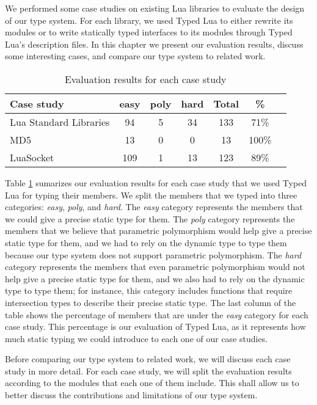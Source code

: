 
We performed some case studies on existing Lua libraries
to evaluate the design of our type system.
For each library, we used Typed Lua to either rewrite its modules
or to write statically typed interfaces to its modules through
Typed Lua's description files.
In this chapter we present our evaluation results, discuss
some interesting cases, and compare our type system to
related work.

\begin{table}[!ht]
\begin{center}
\begin{tabular}{|l|c|c|c|c|c|c|}
\hline
\textbf{Case study} & \textbf{easy} & \textbf{poly} & \textbf{hard} & \textbf{Total} & \textbf{\%} \\
\hline
Lua Standard Libraries & 94 & 5 & 34 & 133 & 71\% \\
\hline
MD5 & 13 & 0 & 0 & 13 & 100\% \\
\hline
LuaSocket & 109 & 1 & 13 & 123 & 89\% \\
\hline
\end{tabular}
\end{center}
\caption{Evaluation results for each case study}
\label{tab:evalbycase}
\end{table}

Table \ref{tab:evalbycase} sumarizes our evaluation results for each
case study that we used Typed Lua for typing their members.
We split the members that we typed into three categories:
\emph{easy}, \emph{poly}, and \emph{hard}.
The \emph{easy} category represents the members that we could give
a precise static type for them.
The \emph{poly} category represents the members that we believe that
parametric polymorphism would help give a precise static type for them,
and we had to rely on the dynamic type to type them because our
type system does not support parametric polymorphism.
The \emph{hard} category represents the members that even parametric
polymorphism would not help give a precise static type for them,
and we also had to rely on the dynamic type to type them;
for instance, this category includes functions that require
intersection types to describe their precise static type.
The last column of the table shows the percentage of members that
are under the \emph{easy} category for each case study.
This percentage is our evaluation of Typed Lua, as it
represents how much static typing we could introduce to each one of
our case studies.

Before comparing our type system to related work, we will discuss
each case study in more detail.
For each case study, we will split the evaluation results according
to the modules that each one of them include.
This shall allow us to better discuss the contributions and limitations
of our type system.

